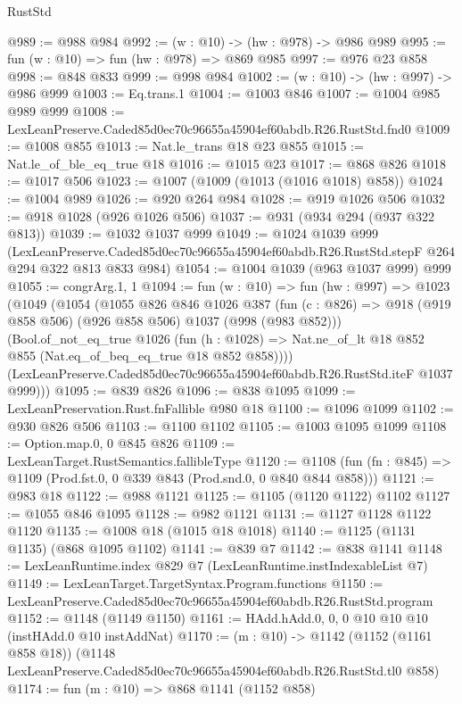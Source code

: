 \begin{lexlean}{RustStd}
\begin{coremodule}
@989 := @988 @984
@992 := (w : @10) -> (hw : @978) -> @986 @989
@995 := fun (w : @10) => fun (hw : @978) => @869 @985
@997 := @976 @23 @858
@998 := @848 @833
@999 := @998 @984
@1002 := (w : @10) -> (hw : @997) -> @986 @999
@1003 := Eq.trans.{1}
@1004 := @1003 @846
@1007 := @1004 @985 @989 @999
@1008 := LexLeanPreserve.Caded85d0ec70c96655a45904ef60abdb.R26.RustStd.fnd0
@1009 := @1008 @855
@1013 := Nat.le_trans @18 @23 @855
@1015 := Nat.le_of_ble_eq_true @18
@1016 := @1015 @23
@1017 := @868 @826
@1018 := @1017 @506
@1023 := @1007 (@1009 (@1013 (@1016 @1018) @858))
@1024 := @1004 @989
@1026 := @920 @264 @984
@1028 := @919 @1026 @506
@1032 := @918 @1028 (@926 @1026 @506)
@1037 := @931 (@934 @294 (@937 @322 @813))
@1039 := @1032 @1037 @999
@1049 := @1024
    @1039
    @999
    (LexLeanPreserve.Caded85d0ec70c96655a45904ef60abdb.R26.RustStd.stepF
      @264
      @294
      @322
      @813
      @833
      @984)
@1054 := @1004 @1039 (@963 @1037 @999) @999
@1055 := congrArg.{1, 1}
@1094 := fun (w : @10) =>
  fun (hw : @997) =>
  @1023
    (@1049
      (@1054
        (@1055
          @826
          @846
          @1026
          @387
          (fun (c : @826) => @918 (@919 @858 @506) (@926 @858 @506) @1037 (@998 (@983 @852)))
          (Bool.of_not_eq_true
            @1026
            (fun (h : @1028) => Nat.ne_of_lt @18 @852 @855 (Nat.eq_of_beq_eq_true @18 @852 @858))))
        (LexLeanPreserve.Caded85d0ec70c96655a45904ef60abdb.R26.RustStd.iteF @1037 @999)))
@1095 := @839 @826
@1096 := @838 @1095
@1099 := LexLeanPreservation.Rust.fnFallible @980 @18
@1100 := @1096 @1099
@1102 := @930 @826 @506
@1103 := @1100 @1102
@1105 := @1003 @1095 @1099
@1108 := Option.map.{0, 0} @845 @826
@1109 := LexLeanTarget.RustSemantics.fallibleType
@1120 := @1108
    (fun (fn : @845) => @1109 (Prod.fst.{0, 0} @339 @843 (Prod.snd.{0, 0} @840 @844 @858)))
@1121 := @983 @18
@1122 := @988 @1121
@1125 := @1105 (@1120 @1122) @1102
@1127 := @1055 @846 @1095
@1128 := @982 @1121
@1131 := @1127 @1128 @1122 @1120
@1135 := @1008 @18 (@1015 @18 @1018)
@1140 := @1125 (@1131 @1135) (@868 @1095 @1102)
@1141 := @839 @7
@1142 := @838 @1141
@1148 := LexLeanRuntime.index @829 @7 (LexLeanRuntime.instIndexableList @7)
@1149 := LexLeanTarget.TargetSyntax.Program.functions
@1150 := LexLeanPreserve.Caded85d0ec70c96655a45904ef60abdb.R26.RustStd.program
@1152 := @1148 (@1149 @1150)
@1161 := HAdd.hAdd.{0, 0, 0} @10 @10 @10 (instHAdd.{0} @10 instAddNat)
@1170 := (m : @10) ->
  @1142
    (@1152 (@1161 @858 @18))
    (@1148 LexLeanPreserve.Caded85d0ec70c96655a45904ef60abdb.R26.RustStd.tl0 @858)
@1174 := fun (m : @10) => @868 @1141 (@1152 @858)

\end{coremodule}
\end{lexlean}
